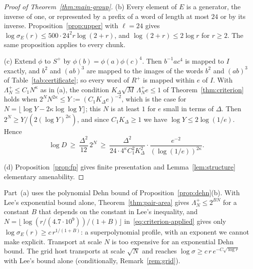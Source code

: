 \begin{proof}[Proof of Theorem~\ref{thm:main-group}]
(b) Every element of $E$ is a generator, the inverse of one, or represented by a prefix of a word of length at most $24$ or by its inverse.
Proposition~\ref{prop:upper} with $\ell=24$ gives $\log\sigma_E(r)\le500\cdot24^2r\log(2+r)$, and $\log(2+r)\le2\log r$ for $r\ge2$. The same
proposition applies to every chunk.

(c) Extend $\phi$ to $S^+$ by $\phi(b)=\phi(a)\phi(c)^4$. Then $b^{-1}ac^4$ is mapped to $I$ exactly, and $b^2$ and $(ab)^3$ are mapped to the
images of the words $b^2$ and $(ab)^3$ of Table~\ref{tab:certificate}; so every word of $R^+$ is mapped within $e$ of $I$. With
$\Lambda^+_N\le C_1N^\kappa$ as in (a), the condition $K_\Delta\sqrt M\,\Lambda^+_Ne\le1$ of Theorem~\ref{thm:criterion} holds when
$2^NN^{2\kappa}\le Y:=(C_1K_\Delta e)^{-2}$, which is the case for $N=\lfloor\log Y-2\kappa\log\log Y\rfloor$; this $N$ is at least $1$ for $e$ small
in terms of $\Delta$. Then $2^N\ge Y/(2(\log Y)^{2\kappa})$, and since $C_1K_\Delta\ge1$ we have $\log Y\le2\log(1/e)$. Hence
\[
\log D\ \ge\ \frac{\Delta^2}{12}\,2^N\ \ge\ \frac{\Delta^2}{24\cdot4^\kappa C_1^2K_\Delta^2}\cdot\frac{e^{-2}}{(\log(1/e))^{2\kappa}}.
\]

(d) Proposition~\ref{prop:fp} gives finite presentation and Lemma~\ref{lem:structure} elementary amenability.
\end{proof}

\begin{remark}\label{rem:lee}
Part~(a) uses the polynomial Dehn bound of Proposition~\ref{prop:dehn}(b). With Lee's exponential bound alone, Theorem~\ref{thm:pair-area} gives
$\Lambda^+_N\le2^{BN}$ for a constant $B$ that depends on the constant in Lee's inequality, and $N=\lfloor\log(r/(4.7\cdot10^9))/(1+B)\rfloor$
in~\eqref{eq:criterion-applied} gives only $\log\sigma_E(r)\ge c\,r^{1/(1+B)}$: a superpolynomial profile, with an exponent we cannot make
explicit. Transport at scale $N$ is too expensive for an exponential Dehn bound. The grid host transports at scale $\sqrt N$ and reaches
$\log\sigma\ge c\,r\,e^{-C\sqrt{\log r}}$ with Lee's bound alone (conditionally, Remark~\ref{rem:grid}).
\end{remark}

